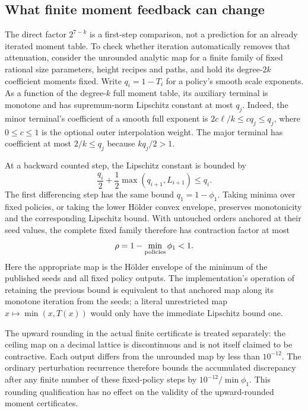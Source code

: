 \documentclass[11pt,letterpaper]{article}
\numberwithin{equation}{section}
\begin{document}
\subsection{What finite moment feedback can change}
\label{sec:feedback-sensitivity}

The direct factor $2^{7-k}$ is a first-step comparison, not a prediction for
an already iterated moment table. To check whether iteration automatically
removes that attenuation, consider the unrounded analytic map for a finite
family of fixed rational size parameters,
height recipes and paths, and hold its degree-$2k$ coefficient moments fixed.
Write $q_i=1-T_i$ for a policy's smooth scale exponents. As a function of the
degree-$k$ full moment table, its auxiliary terminal is monotone and has
supremum-norm Lipschitz constant at most $q_j$. Indeed, the minor terminal's
coefficient of a smooth full exponent is $2c\ell/k\le cq_j\le q_j$,
where $0\le c\le1$ is the optional outer interpolation weight. The major
terminal has coefficient at most $2/k\le q_j$ because $kq_j/2>1$.

At a backward counted step, the Lipschitz constant is bounded by
\[
 \frac{q_i}{2}+\frac12\max(q_{i+1},L_{i+1})\le q_i.
\]
The first differencing step has the same bound $q_1=1-\phi_1$.
Taking minima over fixed policies, or taking the lower H\"older convex
envelope, preserves monotonicity and the corresponding Lipschitz bound.
With untouched orders anchored at their seed values, the complete fixed
family therefore has contraction factor at most
\[
 \rho=1-\min_{\rm policies}\phi_1<1.
\]
Here the appropriate map is the H\"older envelope of the minimum of the
published seeds and all fixed policy outputs. The implementation's operation
of retaining the previous bound is equivalent to that anchored map along
its monotone iteration from the seeds; a literal unrestricted map
$x\mapsto\min(x,T(x))$ would only have the immediate Lipschitz bound one.

The upward rounding in the actual finite certificate is treated separately:
the ceiling map on a decimal lattice is discontinuous and is not itself
claimed to be contractive. Each output differs from the unrounded map by
less than $10^{-12}$. The ordinary perturbation recurrence therefore bounds
the accumulated discrepancy after any finite number of these fixed-policy
steps by $10^{-12}/\min\phi_1$. This rounding qualification has no effect on
the validity of the upward-rounded moment certificates.
\end{document}
